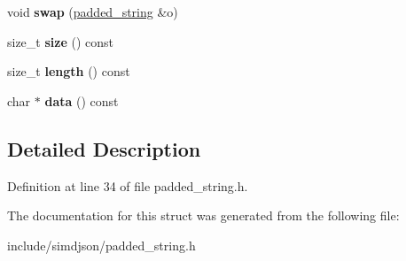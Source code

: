 \begin{DoxyCompactItemize}
void {\bfseries swap} (\hyperlink{structsimdjson_1_1padded__string}{padded\+\_\+string} \&o)
\item 
\mbox{\label{structsimdjson_1_1padded__string_a4c23453d923380e8fb39b5e6289007f0}} 
size\+\_\+t {\bfseries size} () const
\item 
\mbox{\label{structsimdjson_1_1padded__string_a998222a5edf719def1f3be73de285c9c}} 
size\+\_\+t {\bfseries length} () const
\item 
\mbox{\label{structsimdjson_1_1padded__string_a981e99cf1bcd0aa0218459c8720632b5}} 
char $\ast$ {\bfseries data} () const
\end{DoxyCompactItemize}


\subsection{Detailed Description}


Definition at line 34 of file padded\+\_\+string.\+h.



The documentation for this struct was generated from the following file\+:\begin{DoxyCompactItemize}
\item 
include/simdjson/padded\+\_\+string.\+h\end{DoxyCompactItemize}
